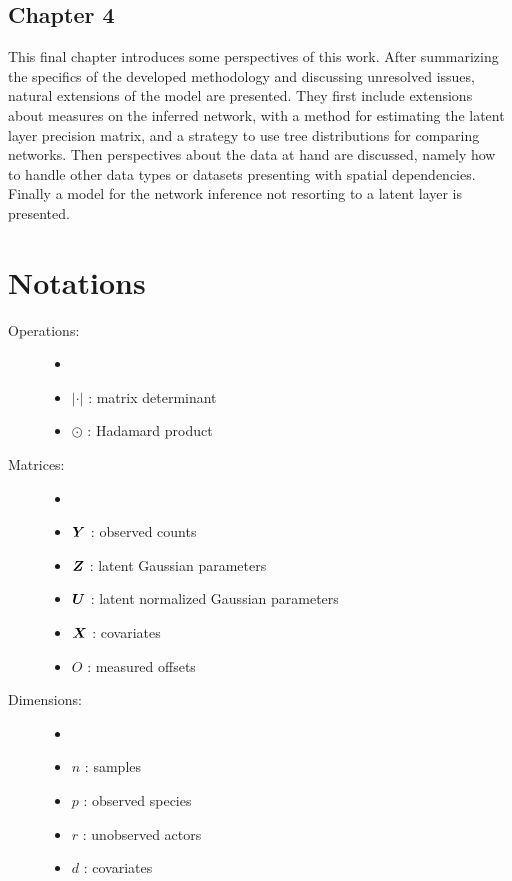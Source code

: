   \subsection*{Chapter 4}
This final chapter introduces some perspectives of this work. After summarizing  the specifics of the developed methodology and discussing unresolved issues, natural extensions of the model are presented. They first include extensions about measures on the inferred network, with a method for estimating the latent layer precision matrix,  and a strategy  to use tree distributions for comparing networks. Then perspectives about the data at hand are discussed, namely how to handle other data types or datasets presenting with spatial dependencies. Finally a model for the network inference not resorting to a latent layer is presented. %
\newpage
 \section*{Notations}
 
 \begin{description}
 \item[Operations:]  \begin{itemize}
     \item[]
 \item[] $|\cdot|$ : matrix determinant
 \item[] $\odot$ : Hadamard product
 \end{itemize}
 \item[Matrices:] \begin{itemize}
     \item[]
 \item[] ${\boldsymbol{Y}}$ : observed counts
 \item[] ${\boldsymbol{Z}}$ :  latent Gaussian parameters 
 \item[] ${\boldsymbol{U}}$ :  latent normalized Gaussian parameters 
 \item[] ${\boldsymbol{X}}$ : covariates 
 \item[] $O$ :  measured offsets
 \end{itemize}
 \item[Dimensions:]\begin{itemize}
     \item[]
 \item[] $n$ : samples
 \item[] $p$ : observed species
 \item[] $r$ : unobserved actors
 \item[] $d$ : covariates
 \end{itemize}
 \end{description} 